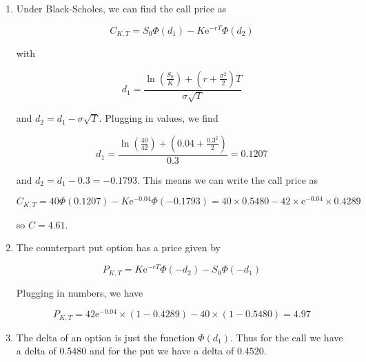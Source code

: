 \documentclass[12pt, letterpaper]{article}
\newcommand{\e}{\mathrm{e}}
\begin{document}
    \begin{enumerate}
    
    \item Under Black-Scholes, we can find the call price as

    \[ C_{K,T} = S_0 \Phi\left(d_1\right) - K \e^{-rT} \Phi\left( d_2 \right)  \]

    with 

    \[ d_1 = \frac{\ln(\frac{S_0}{K}) + \left(r + \frac{\sigma^2}{2}\right) T}{\sigma \sqrt{T}}    \]

    and \( d_2 = d_1 - \sigma \sqrt{T} \). Plugging in values, we find

    \[ d_1 = \frac{\ln(\frac{40}{42}) + \left(0.04 + \frac{0.3^2}{2}\right)}{0.3} = 0.1207  \]

    and \(d_2 = d_1 - 0.3 = -0.1793\). This means we can write the call price as 

    \[ C_{K,T} = 40 \Phi(0.1207) - K \e^{-0.04} \Phi(-0.1793) = 40 \times 0.5480 - 42 \times \e^{-0.04} \times 0.4289      \]

    so \(\boxed{C = 4.61}\).

    \item  The counterpart put option has a price given by
    
    \[ P_{K,T} = K \e^{-rT} \Phi\left(- d_2\right) - S_0 \Phi\left(- d_1\right) \]

    Plugging in numbers, we have 

    \[ \boxed{P_{K,T} = 42 \e^{-0.04} \times (1 - 0.4289) - 40 \times (1 - 0.5480) = 4.97  }     \]

    \item The delta of an option is just the function \(\Phi(d_1)\). Thus for the call we have a delta of \(0.5480\) and for the put we have a delta of \(0.4520\). 

    \end{enumerate}

    
\end{document}

